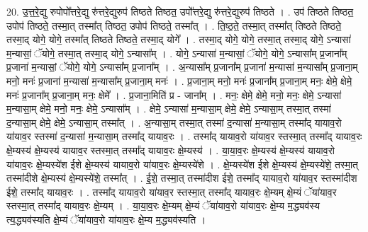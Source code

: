 \documentclass[17pt]{extarticle}
\begin{document}
20. उ॒त्त॒रे॒द्यु रुपोपो᳚त्तरे॒द्यु रु॑त्तरे॒द्युरुप॑ तिष्ठते तिष्ठत॒ उपो᳚त्तरे॒द्यु रु॑त्तरे॒द्युरुप॑ तिष्ठते । . उप॑ तिष्ठते तिष्ठत॒ उपोप॑ तिष्ठते॒ तस्मा॒त् तस्मा᳚त् तिष्ठत॒ उपोप॑ तिष्ठते॒ तस्मा᳚त् । . ति॒ष्ठ॒ते॒ तस्मा॒त् तस्मा᳚त् तिष्ठते तिष्ठते॒ तस्मा॒द् योगे॒ योगे॒ तस्मा᳚त् तिष्ठते तिष्ठते॒ तस्मा॒द् योगे᳚ । . तस्मा॒द् योगे॒ योगे॒ तस्मा॒त् तस्मा॒द् योगे॒ ऽन्यासा॑ म॒न्यासां॒ ॅयोगे॒ तस्मा॒त् तस्मा॒द् योगे॒ ऽन्यासा᳚म् । . योगे॒ ऽन्यासा॑ म॒न्यासां॒ ॅयोगे॒ योगे॒ ऽन्यासा᳚म् प्र॒जाना᳚म् प्र॒जाना॑ म॒न्यासां॒ ॅयोगे॒ योगे॒ ऽन्यासा᳚म् प्र॒जाना᳚म् । . अ॒न्यासा᳚म् प्र॒जाना᳚म् प्र॒जाना॑ म॒न्यासा॑ म॒न्यासा᳚म् प्र॒जाना॒म् मनो॒ मनः॑ प्र॒जाना॑ म॒न्यासा॑ म॒न्यासा᳚म् प्र॒जाना॒म् मनः॑ । . प्र॒जाना॒म् मनो॒ मनः॑ प्र॒जाना᳚म् प्र॒जाना॒म् मनः॒ क्षेमे॒ क्षेमे॒ मनः॑ प्र॒जाना᳚म् प्र॒जाना॒म् मनः॒ क्षेमे᳚ । . प्र॒जाना॒मिति॑ प्र - जाना᳚म् । . मनः॒ क्षेमे॒ क्षेमे॒ मनो॒ मनः॒ क्षेमे॒ ऽन्यासा॑ म॒न्यासा॒म् क्षेमे॒ मनो॒ मनः॒ क्षेमे॒ ऽन्यासा᳚म् । . क्षेमे॒ ऽन्यासा॑ म॒न्यासा॒म् क्षेमे॒ क्षेमे॒ ऽन्यासा॒म् तस्मा॒त् तस्मा॑ द॒न्यासा॒म् क्षेमे॒ क्षेमे॒ ऽन्यासा॒म् तस्मा᳚त् । . अ॒न्यासा॒म् तस्मा॒त् तस्मा॑ द॒न्यासा॑ म॒न्यासा॒म् तस्मा᳚द् यायाव॒रो या॑याव॒र स्तस्मा॑ द॒न्यासा॑ म॒न्यासा॒म् तस्मा᳚द् यायाव॒रः । . तस्मा᳚द् यायाव॒रो या॑याव॒र स्तस्मा॒त् तस्मा᳚द् यायाव॒रः क्षे॒म्यस्य॑ क्षे॒म्यस्य॑ यायाव॒र स्तस्मा॒त् तस्मा᳚द् यायाव॒रः क्षे॒म्यस्य॑ । . या॒या॒व॒रः क्षे॒म्यस्य॑ क्षे॒म्यस्य॑ यायाव॒रो या॑याव॒रः क्षे॒म्यस्ये॑श ईशे क्षे॒म्यस्य॑ यायाव॒रो या॑याव॒रः क्षे॒म्यस्ये॑शे । . क्षे॒म्यस्ये॑श ईशे क्षे॒म्यस्य॑ क्षे॒म्यस्ये॑शे॒ तस्मा॒त् तस्मा॑दीशे क्षे॒म्यस्य॑ क्षे॒म्यस्ये॑शे॒ तस्मा᳚त् । . ई॒शे॒ तस्मा॒त् तस्मा॑दीश ईशे॒ तस्मा᳚द् यायाव॒रो या॑याव॒र स्तस्मा॑दीश ईशे॒ तस्मा᳚द् यायाव॒रः । . तस्मा᳚द् यायाव॒रो या॑याव॒र स्तस्मा॒त् तस्मा᳚द् यायाव॒रः क्षे॒म्यम् क्षे॒म्यं ॅया॑याव॒र स्तस्मा॒त् तस्मा᳚द् यायाव॒रः क्षे॒म्यम् । . या॒या॒व॒रः क्षे॒म्यम् क्षे॒म्यं ॅया॑याव॒रो या॑याव॒रः क्षे॒म्य म॒द्ध्यव॑स्य त्य॒द्ध्यव॑स्यति क्षे॒म्यं ॅया॑याव॒रो या॑याव॒रः क्षे॒म्य म॒द्ध्यव॑स्यति । \newline
\end{document}
